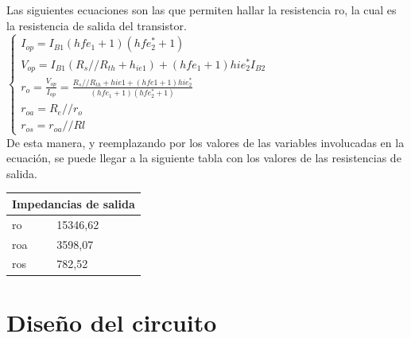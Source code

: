 Las siguientes ecuaciones son las que permiten hallar la resistencia ro,  la cual es la resistencia de salida del transistor.\\

$
		\begin{cases}	
		I_{op}=I_{B1}(hfe_{1}+1)(hfe_{2}^{*}+1)\\
		V_{op}=I_{B1}(R_{s}//R_{th}+h_{ie1})+(hfe_{1}+1)hie_{2}^{*}I_{B2} \\
		r_{o}=\frac{V_{op}}{I_{op}}=\frac{R_{s}//R_{th}+hie1+(hfe1+1)hie_{2}^{*}}{(hfe_{1}+1)(hfe_{2}^{*}+1)}\\
		r_{oa}=R_{e}//r_{o}\\
		r_{os}=r_{oa}//Rl
		\end{cases}
		\label{mod_inc_ecs}
		$\\

De esta manera, y reemplazando por los valores de las variables involucadas en la ecuación, se puede llegar a la siguiente tabla con los valores de las resistencias de salida.

\begin{table}[H]
\centering
\begin{tabular}{ll}
\multicolumn{2}{l}{Impedancias de salida} \\ \hline
ro                & 15346,62              \\
roa               & 3598,07               \\
ros               & 782,52               
\end{tabular}
\end{table}

\section{Diseño del circuito}